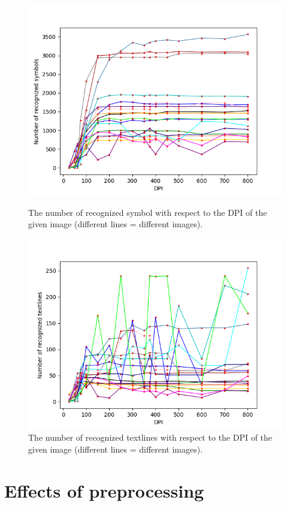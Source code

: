 \begin{figure}[t]
    \includegraphics[width=\linewidth]{img/results/dpiSymbols.png}
    \caption{The number of recognized symbol with respect to the DPI of the given image (different lines = different images).}
    \label{fig:dpiSymbols}
\endminipage\hfill
{}
    \includegraphics[width=\linewidth]{img/results/dpiTextlines.png}
    \caption{The number of recognized textlines with respect to the  DPI of the given image (different lines = different images).}
    \label{fig:dpiTextlines}
\endminipage
\label{resultsDPIAccuracy}
\end{figure}

\section{Effects of preprocessing}

